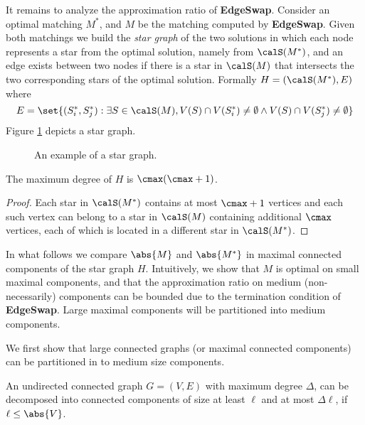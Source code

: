 It remains to analyze the approximation ratio of \textbf{EdgeSwap}.
Consider an optimal matching $M^*$, and $M$ be the matching computed
by \textbf{EdgeSwap}.  Given both matchings we build the \emph{star
graph} of the two solutions in which each node represents a star from
the optimal solution, namely from $\calS(M^*)$, and an edge exists
between two nodes if there is a star in $\calS(M)$ that intersects the
two corresponding stars of the optimal solution.
%
Formally $H = (\calS(M^*), E)$ where
$$
{E = \set{(S^*_i, S^*_j) : \exists S \in \calS(M), 
         V(S) \cap V(S^*_i) \neq \emptyset \land
         V(S) \cap V(S^*_j) \neq \emptyset}}
$$
Figure \ref{fig:conflict} depicts a star graph.

\begin{figure}
%
%
\hfill
%
%
\caption[An example of a star graph]{An example of a star graph.}
\label{fig:conflict}
\end{figure}  

\begin{lemma}
The maximum degree of $H$ is $\cmax(\cmax+1)$.
\end{lemma}
\begin{proof}
Each star in $\calS(M^*)$ contains at most $\cmax+1$ vertices and each
such vertex can belong to a star in $\calS(M)$ containing additional
$\cmax$ vertices, each of which is located in a different star in
$\calS(M^*)$.
\end{proof}

In what follows we compare $\abs{M}$ and $\abs{M^*}$ in maximal
connected components of the star graph $H$.  Intuitively, we show that
$M$ is optimal on small maximal components, and that the approximation
ratio on medium (non-necessarily) components can be bounded due to the
termination condition of \textbf{EdgeSwap}.  Large maximal components
will be partitioned into medium components.

We first show that large connected graphs (or maximal connected
components) can be partitioned in to medium size components.  

\begin{lemma}
\label{lemma:dec}
An undirected connected graph $G = (V,E)$ with maximum degree
$\Delta$, can be decomposed into connected components of size at least
$\ell$ and at most $\Delta \ell$, if $\ell \leq \abs{V}$.
\end{lemma}

